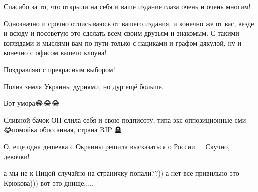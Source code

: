 \begin{itemize}
Спасибо за то, что открыли на себя и ваше издание глаза очень и очень многим!

Однозначно и срочно отписываюсь от вашего издания, и конечно же от вас, везде и
всюду и посоветую это сделать всем своим друзьям и знакомым. С такими взглядами
и мыслями вам по пути только с нациками и графом дякулой, ну и конечно с офисом
вашего клоуна! 

Поздравляю с прекрасным выбором!


 
Полна земля Украины дурнями, но дур ещё больше.

 
Вот умора😂😂😂

 
Сливной бачок ОП слила себя и свою подписоту, типа экс оппозиционные сми 😂помойка обоссанная, страна RIP 🪦

 
О, еще одна дешевка с Окраины решила высказаться о России 🤣🤣🤣 Скучно, девочки!

 
а мы не к Ницой случайно на страничку попали??)) а нет все привильно это Крюкова))) вот это днище.....

 


\end{itemize}
